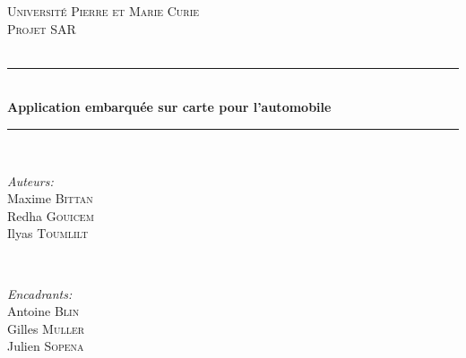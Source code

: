 \begin{titlepage}

\newcommand{\HRule}{\rule{\linewidth}{0.5mm}} %

\center %
 

\textsc{\LARGE Université Pierre et Marie Curie}\\[1.5cm] %
\textsc{\Large Projet SAR}\\[0.5cm] %
\textsc{\large }\\[0.5cm] %


\HRule \\[0.4cm]
{ \huge \bfseries Application embarquée sur carte pour l'automobile}\\[0.4cm] %
\HRule \\[1.5cm]
 

\begin{minipage}{0.4\textwidth}
\begin{flushleft} \large
\emph{Auteurs:}\\
Maxime \textsc{Bittan}\\
Redha \textsc{Gouicem}\\
Ilyas \textsc{Toumlilt} 
\end{flushleft}
\end{minipage}
~
\begin{minipage}{0.4\textwidth}
\begin{flushright} \large
\emph{Encadrants:} \\
Antoine \textsc{Blin}\\
Gilles \textsc{Muller}\\
Julien \textsc{Sopena}
\end{flushright}
\end{minipage}\\[2cm]


\end{titlepage}
